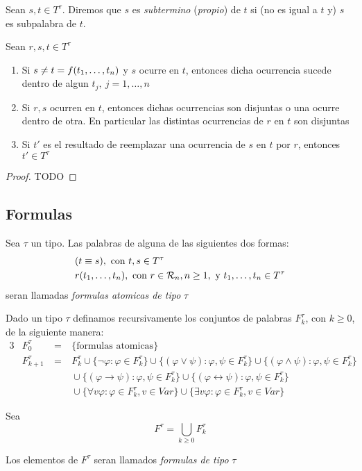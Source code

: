 \begin{definition}
  Sean $s, t \in T^\tau$. Diremos que $s$ es \emph{subtermino} (\emph{propio}) de $t$ si (no es igual a $t$ y) $s$ es subpalabra de $t$.
\end{definition}

\begin{lemma}
  Sean $r, s, t \in T^\tau$
  \begin{enumerate}
    \item Si $s \neq t = f(t_{1}, \dots, t_{n})$ y $s$ ocurre en $t$, entonces dicha ocurrencia sucede dentro de algun $t_j,\ j = 1, \dots, n$
    \item Si $r, s$ ocurren en $t$, entonces dichas ocurrencias son disjuntas o una ocurre dentro de otra. En particular las distintas ocurrencias de $r$ en $t$ son disjuntas
    \item Si $t'$ es el resultado de reemplazar una ocurrencia de $s$ en $t$ por $r$, entonces $t' \in T^\tau$
  \end{enumerate}
\end{lemma}
\begin{proof}
  TODO
\end{proof}

\subsection{Formulas}

\begin{definition}
  Sea $\tau$ un tipo. Las palabras de alguna de las siguientes dos formas:
  \begin{alignat*}{3}
    &(t \equiv s), \text{ con } t, s \in T^\tau\\
    &r(t_{1}, \dots, t_{n}), \text{ con } r \in \mathcal{R}_n, n \geq 1, \text{ y } t_{1}, \dots, t_{n} \in T^\tau
  \end{alignat*}
  seran llamadas \emph{formulas atomicas de tipo} $\tau$
\end{definition}

\begin{definition}
  Dado un tipo $\tau$ definamos recursivamente los conjuntos de palabras $F_k^\tau$, con $k \geq 0$, de la siguiente manera:
  \begin{alignat*}{3}
    &F_0^\tau &\ =&\ \{\text{formulas atomicas}\}\\
    &F_{k+1}^\tau &\ =&\ F_k^\tau \cup \{\neg\varphi: \varphi \in F_k^\tau\} \cup \{(\varphi \lor \psi): \varphi, \psi \in F_k^\tau\} \cup \{(\varphi \land \psi): \varphi, \psi \in F_k^\tau\}\\
    &&\ &\ \cup \{(\varphi \rightarrow \psi): \varphi, \psi \in F_k^\tau\} \cup \{(\varphi \leftrightarrow \psi): \varphi, \psi \in F_k^\tau\}\\
    &&\ &\ \cup \{\forall v\varphi: \varphi \in F_k^\tau, v \in Var\} \cup \{\exists v\varphi: \varphi \in F_k^\tau, v \in Var\}
  \end{alignat*}

  Sea 
  $$
  F^\tau = \bigcup_{k \geq 0} F_k^\tau
  $$

  Los elementos de $F^\tau$ seran llamados \emph{formulas de tipo} $\tau$
\end{definition}

